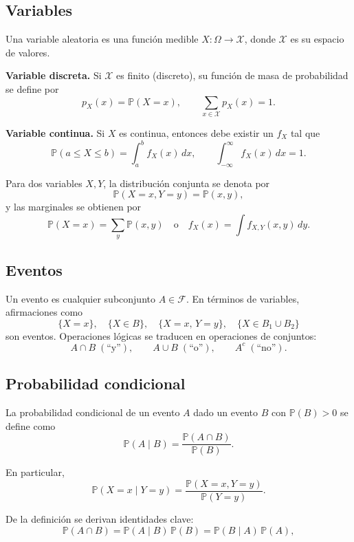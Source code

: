 \documentclass[12pt]{report} %
\begin{document}
\subsection{Variables}

Una variable aleatoria es una función medible $X:\Omega\to\mathcal{X}$, donde $\mathcal{X}$ es su espacio de valores.

\textbf{Variable discreta.} Si $\mathcal{X}$ es finito (discreto), su función de masa de probabilidad se define por
$$
    p_X(x)=\mathbb{P}(X=x),
    \qquad
    \sum_{x\in\mathcal{X}} p_X(x)=1.
$$

\textbf{Variable continua.} Si $X$ es continua, entonces debe existir un $f_X$ tal que
$$
    \mathbb{P}(a\leq X\leq b)=\int_a^b f_X(x)\,dx,
    \qquad
    \int_{-\infty}^{\infty} f_X(x)\,dx=1.
$$

Para dos variables $X,Y$, la distribución conjunta se denota por
$$
    \mathbb{P}(X=x,Y=y)=\mathbb{P}(x,y),
$$
y las marginales se obtienen por
$$
    \mathbb{P}(X=x)=\sum_y \mathbb{P}(x,y)
    \quad\text{o}\quad
    f_X(x)=\int f_{X,Y}(x,y)\,dy.
$$

\subsection{Eventos}

Un evento es cualquier subconjunto $A\in\mathcal{F}$. En términos de variables, afirmaciones como
$$
    \{X=x\},\quad \{X\in B\},\quad \{X=x,\,Y=y\},\quad \{X\in B_1\cup B_2\}
$$
son eventos. Operaciones lógicas se traducen en operaciones de conjuntos:
$$
    A\cap B\;(\text{``y''}),
    \qquad
    A\cup B\;(\text{``o''}),
    \qquad
    A^c\;(\text{``no''}).
$$

\subsection{Probabilidad condicional}

La probabilidad condicional de un evento $A$ dado un evento $B$ con $\mathbb{P}(B)>0$ se define como
\begin{equation}
    \mathbb{P}(A\mid B)=\frac{\mathbb{P}(A\cap B)}{\mathbb{P}(B)}.
    \label{eq:conditional_probability_definition}
\end{equation}

En particular,
$$
    \mathbb{P}(X=x\mid Y=y)=\frac{\mathbb{P}(X=x,Y=y)}{\mathbb{P}(Y=y)}.
$$

De la definición se derivan identidades clave:
\begin{equation}
    \mathbb{P}(A\cap B)=\mathbb{P}(A\mid B)\,\mathbb{P}(B)=\mathbb{P}(B\mid A)\,\mathbb{P}(A),
    \label{eq:product_rule_probability}
\end{equation}
\end{document}

